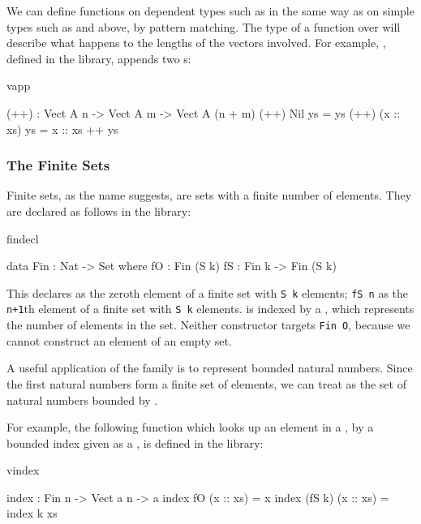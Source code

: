 We can define functions on dependent types such as  in the same way
as on simple types such as  and  above, by pattern matching.
The type of a function over  will describe what happens to the
lengths of the vectors involved. For example, \tFN{++}, defined in the
library, appends two s:

\begin{SaveVerbatim}{vapp}

(++) : Vect A n -> Vect A m -> Vect A (n + m)
(++) Nil       ys = ys
(++) (x :: xs) ys = x :: xs ++ ys

\end{SaveVerbatim}

\subsubsection{The Finite Sets}

Finite sets, as the name suggests, are sets with a finite number of elements.
They are declared as follows in the library:

\begin{SaveVerbatim}{findecl}

data Fin : Nat -> Set where
   fO : Fin (S k)
   fS : Fin k -> Fin (S k)

\end{SaveVerbatim}

\noindent
This declares
 as the zeroth element of a finite set with \texttt{S k} elements; 
\texttt{fS n} as the
\texttt{n+1}th element of a finite set with \texttt{S k} elements. 
 is indexed by a , which
represents the number of elements in the set. 
Neither constructor targets \texttt{Fin O}, because we cannot construct an
element of an empty set.

A useful application of the  family is to represent bounded
natural numbers. Since the first  natural numbers form a finite
set of  elements, we can treat  as the set of natural
numbers bounded by . 

For example, the following function which looks up an element in a ,
by a bounded index given as a , is defined in the library:

\begin{SaveVerbatim}{vindex}

index : Fin n -> Vect a n -> a
index fO     (x :: xs) = x
index (fS k) (x :: xs) = index k xs

\end{SaveVerbatim}

